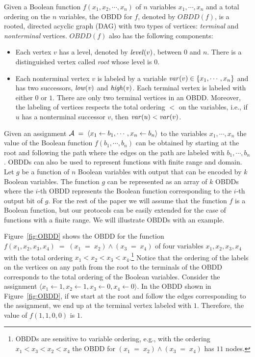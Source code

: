 Given a Boolean function $f(x_1,x_2,\cdots,x_n)$ of $n$ variables
$x_1, \cdots, x_n$ and a total ordering on the $n$ variables, the OBDD
for $f$, denoted by $OBDD(f)$, is a rooted, directed acyclic graph
(DAG) with two types of vertices: {\it terminal} and {\it nonterminal}
vertices. $OBDD(f)$ also has the following components:
\begin{itemize}
\item Each vertex
$v$ has a level, denoted by ${\it level}(v)$, between $0$ and $n$. There is a 
distinguished vertex called  {\it root} whose level is $0$. 

\item Each nonterminal vertex $v$ is labeled by a variable ${\it var}(v) \in \{ x_1,\cdots,x_n \}$ and 
has two successors, ${\it low (v)}$ and ${\it high (v)}$. Each
terminal vertex is labeled with either $0$ or $1$. There are only two terminal vertices 
in an OBDD. Moreover, the labeling of vertices respects the total ordering $<$ on the
variables, i.e., if $u$ has a nonterminal successor $v$, then ${\it var}(u) < {\it var}(v)$. 
\end{itemize}
Given an assignment ${\cal A} \; = \; \langle x_1 \leftarrow b_1,
\cdots, x_n \leftarrow b_n \rangle$ to the variables $x_1,\cdots,x_n$
the value of the Boolean function $f(b_1,\cdots,b_n)$ can be obtained by
starting at the root and following the path where the edges on the
path are labeled with $b_1, \cdots, b_n$. OBDDs can also be used to
represent functions with finite range and domain. Let $g$ be a
function of $n$ Boolean variables with output that can be encoded by
$k$ Boolean variables. The function $g$ can be represented as an array
of $k$ OBDDs where the $i$-th OBDD represents the Boolean function
corresponding to the $i$-th output bit of $g$.  For the rest of the
paper we will assume that the function $f$ is a Boolean function, but
our protocols can be easily extended for the case of functions with a
finite range. We will illustrate OBDDs with an example.
\begin{example}
\label{example:bdd}
\rm
Figure~\ref{fig:OBDD} shows the OBDD for the  function
$f(x_1,x_2,x_3, x_4) \; = \; (x_1 \; = \; x_2) \wedge (x_3 \; = \;
x_4)$ of four variables $x_1,x_2,x_3,x_4$ with the total ordering $x_1
< x_2 < x_3 < x_4$.\footnote{OBDDs are sensitive to variable
ordering, e.g., with the ordering $x_1 < x_3 < x_2 < x_4$ the OBDD for
$(x_1 \; = \; x_2) \wedge (x_3 \; = \; x_4)$ has $11$ nodes.}  Notice that the ordering of
the labels on the vertices on any path from the root to the terminals
of the OBDD corresponds to the total ordering of the Boolean
variables. Consider the assignment $\langle x_1 \leftarrow 1, x_2
\leftarrow 1, x_3 \leftarrow 0, x_4 \leftarrow 0 \rangle$.  In the
OBDD shown in Figure~\ref{fig:OBDD}, if we start at the root and
follow the edges corresponding to the assignment, we end up at the
terminal vertex labeled with $1$. Therefore, the value of $f(1,1,0,0)$
is $1$.
\end{example}

